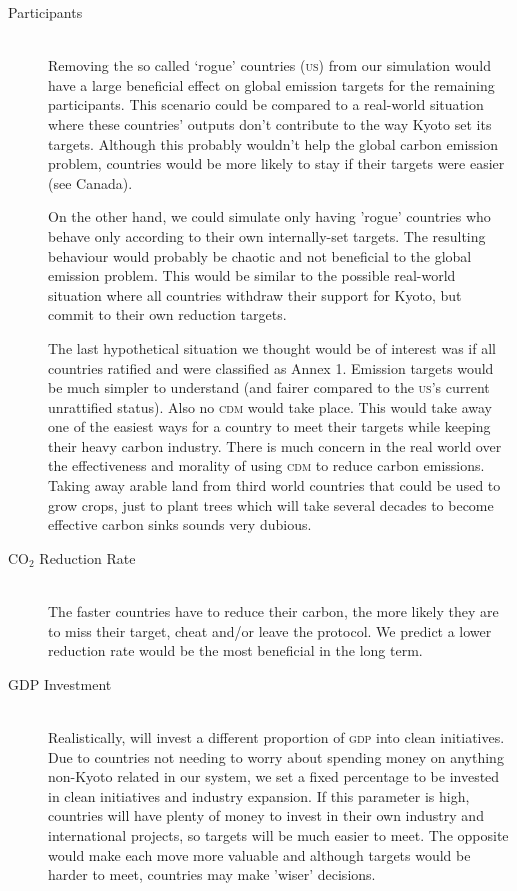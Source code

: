 \begin{description}
\item[Participants] \hfill \\

Removing the so called `rogue' countries (\textsc{us}) from our simulation would have a large beneficial effect on global emission  targets for the remaining participants. This scenario could be compared to a real-world situation where these countries' outputs don't contribute to the way Kyoto set its targets. Although this probably wouldn't help the global carbon emission problem, countries would be more likely to stay if their targets were easier (see Canada).

On the other hand, we could simulate only having 'rogue' countries who behave only according to their own internally-set targets. The resulting behaviour would probably be chaotic and not beneficial to the global emission problem. This would be similar to the possible real-world situation where all countries withdraw their support for Kyoto, but commit to their own reduction targets.

The last hypothetical situation we thought would be of interest was if all countries ratified and were classified as Annex 1. Emission targets would be much simpler to understand (and fairer compared to the \textsc{us}'s current unrattified status). Also no \textsc{cdm} would take place. This would take away one of the easiest ways for a country to meet their targets while keeping their heavy carbon industry. There is much concern in the real world over the effectiveness and morality of using \textsc{cdm} to reduce carbon emissions. Taking away arable land from third world countries that could be used to grow crops, just to plant trees which will take several decades to become effective carbon sinks sounds very dubious.

\item[CO$_2$ Reduction Rate] \hfill \\

The faster countries have to reduce their carbon, the more likely they are to miss their target, cheat and/or leave the protocol. We predict a lower reduction rate would be the most beneficial in the long term.

\item[GDP Investment] \hfill \\

Realistically, will invest a different proportion of \textsc{gdp} into clean initiatives. Due to countries not needing to worry about spending money on anything non-Kyoto related in our system, we set a fixed percentage to be invested in clean initiatives and industry expansion. If this parameter is high, countries will have plenty of money to invest in their own industry and international projects, so targets will be much easier to meet. The opposite would make each move more valuable and although targets would be harder to meet, countries may make 'wiser' decisions.


\end{description}
